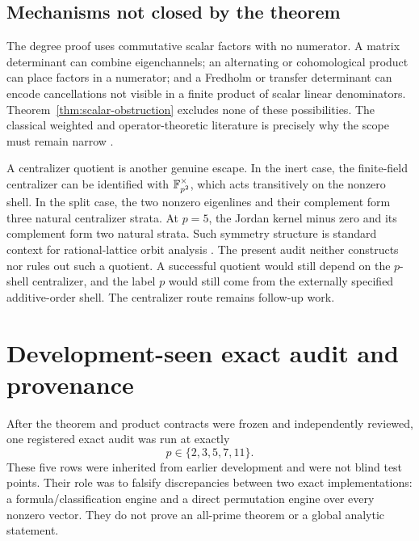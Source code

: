 \documentclass[11pt]{article}
\theoremstyle{definition}
\theoremstyle{remark}
\begin{document}
\subsection{Mechanisms not closed by the theorem}

The degree proof uses commutative scalar factors with no numerator.  A
matrix determinant can combine eigenchannels; an alternating or
cohomological product can place factors in a numerator; and a Fredholm or
transfer determinant can encode cancellations not visible in a finite
product of scalar linear denominators.  Theorem~\ref{thm:scalar-obstruction}
excludes none of these possibilities.  The classical weighted and
operator-theoretic literature is precisely why the scope must remain narrow
\citep{Ruelle1976,ParryPollicott1990}.

A centralizer quotient is another genuine escape.  In the inert case, the
finite-field centralizer can be identified with \(\mathbb{F}_{p^2}^{\times}\),
which acts transitively on the nonzero shell.  In the split case, the two
nonzero eigenlines and their complement form three natural centralizer
strata.  At \(p=5\), the Jordan kernel minus zero and its complement form
two natural strata.  Such symmetry structure is standard context for
rational-lattice orbit analysis \citep{BaakeNeumaerkerRoberts2013}.
The present audit neither constructs nor rules out such a quotient.  A
successful quotient would still depend on the \(p\)-shell centralizer, and
the label \(p\) would still come from the externally specified
additive-order shell.  The centralizer route remains follow-up work.

\section{Development-seen exact audit and provenance}
\label{sec:audit}

After the theorem and product contracts were frozen and independently
reviewed, one registered exact audit was run at exactly
\begin{equation}
  p\in\{2,3,5,7,11\}.
  \label{eq:registered-primes}
\end{equation}
These five rows were inherited from earlier development and were not blind
test points.  Their role was to falsify discrepancies between two exact
implementations: a formula/classification engine and a direct permutation
engine over every nonzero vector.  They do not prove an all-prime theorem or
a global analytic statement.
\end{document}
